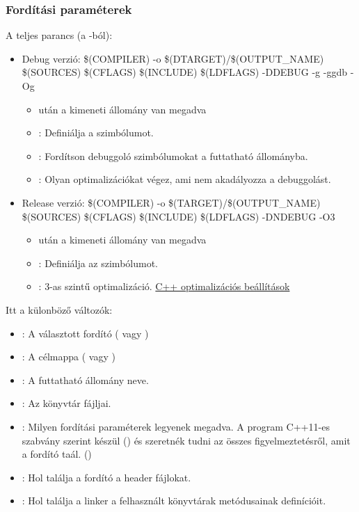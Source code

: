 \subsubsection{Ford\'it\'asi param\'eterek}\label{compileoptions}
A teljes parancs (a -b\'ol): 
\begin{itemize}
	\item Debug verzi\'o:
		\$(COMPILER) -o \$(DTARGET)/\$(OUTPUT\_NAME) \$(SOURCES) \$(CFLAGS) \$(INCLUDE) \$(LDFLAGS) -DDEBUG -g -ggdb -Og
		\begin{itemize}
			\item {} ut\'an a kimeneti \'allom\'any van megadva
			\item {}: Defini\'alja a  szimb\'olumot.
			\item {}: Ford\'itson debuggol\'o szimb\'olumokat a futtathat\'o \'allom\'anyba.
			\item {}: Olyan optimaliz\'aci\'okat v\'egez, ami nem akad\'alyozza a debuggol\'ast.
		\end{itemize}
	\item Release verzi\'o:
		\$(COMPILER) -o \$(TARGET)/\$(OUTPUT\_NAME) \$(SOURCES) \$(CFLAGS) \$(INCLUDE) \$(LDFLAGS) -DNDEBUG -O3
		\begin{itemize}
			\item {} ut\'an a kimeneti \'allom\'any van megadva
			\item {}: Defini\'alja az  szimb\'olumot.
			\item {}: 3-as szint\H u optimaliz\'aci\'o. \href{https://gcc.gnu.org/onlinedocs/gcc/Optimize-Options.html}{C++ optimaliz\'aci\'os be\'all\'it\'asok}
		\end{itemize}
\end{itemize}
Itt a k\"ulonb\"oz\H o v\'altoz\'ok:
\begin{itemize}
	\item {}: A v\'alasztott ford\'it\'o ( vagy )
	\item {}: A c\'elmappa ( vagy ) 
	\item {}: A futtathat\'o \'allom\'any neve.
	\item {}: Az  k\"onyvt\'ar  f\'ajljai.
	\item {}: Milyen ford\'it\'asi param\'eterek legyenek megadva.
		A program C++11-es szabv\'any szerint k\'esz\"ul () \'es szeretn\'ek tudni az \"osszes figyelmeztet\'esr\H ol, amit a ford\'it\'o ta\'al. ()
	\item {}: Hol tal\'alja a ford\'it\'o a header f\'ajlokat. 
	\item {}: Hol tal\'alja a linker a felhaszn\'alt k\"onyvt\'arak met\'odusainak defin\'ici\'oit. 
\end{itemize}

